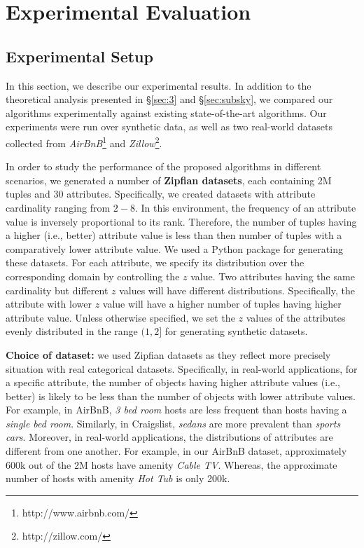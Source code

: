 \section{Experimental Evaluation}\label{sec:experiments}
\subsection{Experimental Setup}

In this section, we describe our experimental results. In addition to the theoretical analysis presented in \S\ref{sec:3} and \S\ref{sec:subsky}, we compared our algorithms experimentally against existing state-of-the-art algorithms.  Our experiments were run over synthetic data, as well as two real-world datasets collected from \emph{AirBnB}\footnote{\small{http://www.airbnb.com/}} and \emph{Zillow}\footnote{\small{http://zillow.com/}}.

\vspace{1mm}
In order to study the performance of the proposed algorithms in different scenarios, we generated a number of {\bf Zipfian datasets}, each containing 2M tuples and 30 attributes. Specifically, we created datasets with attribute cardinality ranging from  $2 - 8$. In this environment, the frequency of an attribute value is inversely proportional to its rank.  Therefore, the number of tuples having a higher (i.e., better) attribute value is less than then number of tuples with a comparatively lower attribute value. We used a Python package for generating these datasets. For each attribute, we specify its distribution over the corresponding domain by controlling the $z$ value. Two attributes having the same cardinality but different $z$ values will have different distributions. Specifically, the attribute with lower $z$ value will have a higher number of tuples having higher attribute value. Unless otherwise specified, we set the $z$ values of the attributes evenly distributed in the range $(1, 2]$ for generating synthetic datasets.


\vspace{1mm}
{\bf Choice of dataset:} we used Zipfian datasets as they reflect more precisely situation with real categorical datasets. Specifically, in real-world applications, for a specific attribute, the number of objects having higher attribute values (i.e., better) is likely to be less than the number of objects with lower attribute values. For example, in AirBnB, \emph{3 bed room} hosts are less frequent than hosts having a \emph{single bed room}. Similarly, in Craigslist, \emph{sedans} are more prevalent than \emph{sports cars}. Moreover, in real-world applications, the distributions of attributes are different from one another. For example, in our AirBnB dataset, approximately 600k out of the 2M hosts have amenity \emph{Cable TV}. Whereas, the approximate number of hosts with amenity \emph{Hot Tub} is only 200k.



